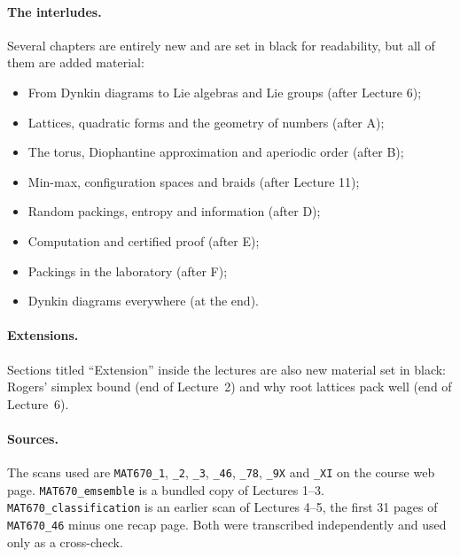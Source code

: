 \documentclass[11pt,openany]{book}
\theoremstyle{plain}
\theoremstyle{definition}
\theoremstyle{remark}
\begin{document}
\paragraph{The interludes.} Several chapters are entirely new and are set in black for readability, but
all of them are added material:
\begin{itemize}
\item[A] From Dynkin diagrams to Lie algebras and Lie groups (after Lecture 6);
\item[B] Lattices, quadratic forms and the geometry of numbers (after A);
\item[C] The torus, Diophantine approximation and aperiodic order (after B);
\item[D] Min-max, configuration spaces and braids (after Lecture 11);
\item[E] Random packings, entropy and information (after D);
\item[F] Computation and certified proof (after E);
\item[G] Packings in the laboratory (after F);
\item[H] Dynkin diagrams everywhere (at the end).
\end{itemize}

\paragraph{Extensions.} Sections titled ``Extension'' inside the lectures are also new material set in
black: Rogers' simplex bound (end of Lecture~2) and why root lattices pack well (end of Lecture~6).

\paragraph{Sources.} The scans used are \texttt{MAT670\_1}, \texttt{\_2}, \texttt{\_3},
\texttt{\_46}, \texttt{\_78}, \texttt{\_9X} and \texttt{\_XI} on the course web page.
\texttt{MAT670\_emsemble} is a bundled copy of Lectures 1--3.
\texttt{MAT670\_classification} is an earlier scan of Lectures 4--5, the first 31 pages of
\texttt{MAT670\_46} minus one recap page. Both were transcribed independently and used only as a
cross-check.
\end{document}

